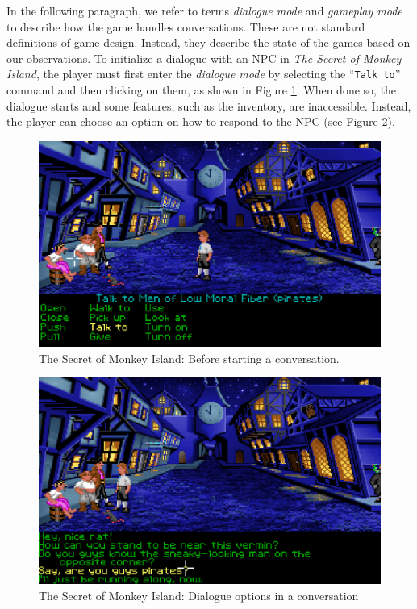 In the following paragraph, we refer to terms \textit{dialogue mode} and \textit{gameplay mode} to describe how the game handles conversations. These are not standard definitions of game design. Instead, they describe the state of the games based on our observations. To initialize a dialogue with an NPC in \textit{The Secret of Monkey Island}, the player must first enter the \textit{dialogue mode} by selecting the “\texttt{Talk to}” command and then clicking on them, as shown in Figure \ref{fig:D-TSoMI0}. When done so, the dialogue starts and some features, such as the inventory, are inaccessible. Instead, the player can choose an option on how to respond to the NPC (see Figure \ref{fig:D-TSoMI1}). 

\begin{figure}[H]
\centering
\includegraphics[width=.8\linewidth]{img/D-TSoMI0.png}
\caption{The Secret of Monkey Island: Before starting a conversation.}
\label{fig:D-TSoMI0}
\end{figure}

\begin{figure}[H]
\centering
\includegraphics[width=.8\linewidth]{img/D-TSoMI1.png}
\caption{The Secret of Monkey Island: Dialogue options in a conversation}
\label{fig:D-TSoMI1}
\end{figure}

